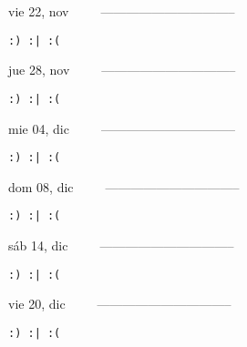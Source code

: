 \documentclass[letterpaper,10pt]{article}
\begin{document}
\begin{multicols}{3}
{vie 22, nov\ \ \ \ \ --------------------------------}
\begin{flushright}\begin{small}\texttt{:) :| :(}\end{small}\end{flushright}
\vfill
{jue 28, nov\ \ \ \ \ --------------------------------}
\begin{flushright}\begin{small}\texttt{:) :| :(}\end{small}\end{flushright}\par
\vfill
{mie 04, dic\ \ \ \ \ --------------------------------}
\begin{flushright}\begin{small}\texttt{:) :| :(}\end{small}\end{flushright}\par
\vfill
\end{multicols}
\vspace{1.05cm}

\begin{multicols}{3}
{dom 08, dic\ \ \ \ \ --------------------------------}
\begin{flushright}\begin{small}\texttt{:) :| :(}\end{small}\end{flushright}
\vfill
{sáb 14, dic\ \ \ \ \ --------------------------------}
\begin{flushright}\begin{small}\texttt{:) :| :(}\end{small}\end{flushright}\par
\vfill
{vie 20, dic\ \ \ \ \ --------------------------------}
\begin{flushright}\begin{small}\texttt{:) :| :(}\end{small}\end{flushright}\par
\vfill
\end{multicols}
\vspace{1.05cm}
\end{document}
